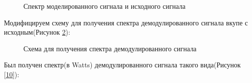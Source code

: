 \documentclass[a4paper,14pt]{extarticle}
\begin{document}
\begin{figure}[H]
\caption{Спектр моделированного сигнала и исходного сигнала}
\label{8}
\end{figure}

Модифицируем схему для получения спектра демодулированного сигнала вкупе с исходным(Рисунок \ref{9}):

\begin{figure}[H]
\caption{Схема для получения спектра демодулированного сигнала}
\label{9}
\end{figure}

Был получен спектр(в Watts) демодулированного сигнала такого вида(Рисунок \ref{10}):
\end{document}

